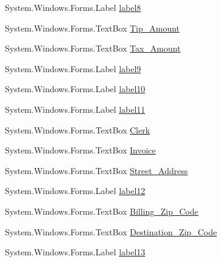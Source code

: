 \begin{DoxyCompactItemize}
\item 
System.\+Windows.\+Forms.\+Label \mbox{\hyperlink{class_cert_complete_1_1_test___creation___form_ac66decbbf99f0781659899babc2e5bd5}{label8}}
\item 
System.\+Windows.\+Forms.\+Text\+Box \mbox{\hyperlink{class_cert_complete_1_1_test___creation___form_ad0d4ae51bcce9794b22bfd72db8d5208}{Tip\+\_\+\+Amount}}
\item 
System.\+Windows.\+Forms.\+Text\+Box \mbox{\hyperlink{class_cert_complete_1_1_test___creation___form_acae08c070ab8eaee3cd6d163f14e220b}{Tax\+\_\+\+Amount}}
\item 
System.\+Windows.\+Forms.\+Label \mbox{\hyperlink{class_cert_complete_1_1_test___creation___form_a14c440e0f47e1eff505754c4fb7448d6}{label9}}
\item 
System.\+Windows.\+Forms.\+Label \mbox{\hyperlink{class_cert_complete_1_1_test___creation___form_ad8ae06387dd71ee4301eb806c6379b32}{label10}}
\item 
System.\+Windows.\+Forms.\+Label \mbox{\hyperlink{class_cert_complete_1_1_test___creation___form_ab070708330c0b3526f05ab8ed70a9996}{label11}}
\item 
System.\+Windows.\+Forms.\+Text\+Box \mbox{\hyperlink{class_cert_complete_1_1_test___creation___form_a2c18a836f168660975990d0afbfc1de1}{Clerk}}
\item 
System.\+Windows.\+Forms.\+Text\+Box \mbox{\hyperlink{class_cert_complete_1_1_test___creation___form_a678908b8b94a28bec2c5bf0649900ac2}{Invoice}}
\item 
System.\+Windows.\+Forms.\+Text\+Box \mbox{\hyperlink{class_cert_complete_1_1_test___creation___form_a8b4f80f7dad92b53b62b42d9b82fa659}{Street\+\_\+\+Address}}
\item 
System.\+Windows.\+Forms.\+Label \mbox{\hyperlink{class_cert_complete_1_1_test___creation___form_a89c5b333ce79bf270f2eae16c9af26af}{label12}}
\item 
System.\+Windows.\+Forms.\+Text\+Box \mbox{\hyperlink{class_cert_complete_1_1_test___creation___form_a963ccdc0c3840d7d8eaf4daa464ac5c9}{Billing\+\_\+\+Zip\+\_\+\+Code}}
\item 
System.\+Windows.\+Forms.\+Text\+Box \mbox{\hyperlink{class_cert_complete_1_1_test___creation___form_a7070fe614213d1e334929e333df5804e}{Destination\+\_\+\+Zip\+\_\+\+Code}}
\item 
System.\+Windows.\+Forms.\+Label \mbox{\hyperlink{class_cert_complete_1_1_test___creation___form_a9a222a91af242677ae78e6f50df1220b}{label13}}
\item 

\end{DoxyCompactItemize}
